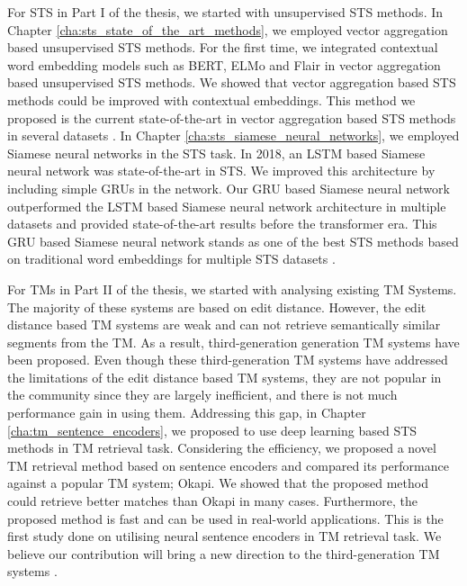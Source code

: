 For STS in Part I of the thesis, we started with unsupervised STS methods. In Chapter \ref{cha:sts_state_of_the_art_methods}, we employed vector aggregation based unsupervised STS methods. For the first time, we integrated contextual word embedding models such as BERT, ELMo and Flair in vector aggregation based unsupervised STS methods. We showed that vector aggregation based STS methods could be improved with contextual embeddings. This method we proposed is the current state-of-the-art in vector aggregation based STS methods in several datasets \autocite{ranasinghe-etal-2019-enhancing}. In Chapter \ref{cha:sts_siamese_neural_networks}, we employed Siamese neural networks in the STS task. In 2018, an LSTM based Siamese neural network was state-of-the-art in STS. We improved this architecture by including simple GRUs in the network. Our GRU based Siamese neural network outperformed the LSTM based Siamese neural network architecture in multiple datasets and provided state-of-the-art results before the transformer era. This GRU based Siamese neural network stands as one of the best STS methods based on traditional word embeddings for multiple STS datasets \autocite{ranasinghe-etal-2019-semantic}.

For TMs in Part II of the thesis, we started with analysing existing TM Systems. The majority of these systems are based on edit distance. However, the edit distance based TM systems are weak and can not retrieve semantically similar segments from the TM. As a result, third-generation generation TM systems have been proposed. Even though these third-generation TM systems have addressed the limitations of the edit distance based TM systems, they are not popular in the community since they are largely inefficient, and there is not much performance gain in using them. Addressing this gap, in Chapter \ref{cha:tm_sentence_encoders}, we proposed to use deep learning based STS methods in TM retrieval task. Considering the efficiency, we proposed a novel TM retrieval method based on sentence encoders and compared its performance against a popular TM system; Okapi. We showed that the proposed method could retrieve better matches than Okapi in many cases. Furthermore, the proposed method is fast and can be used in real-world applications. This is the first study done on utilising neural sentence encoders in TM retrieval task. We believe our contribution will bring a new direction to the third-generation TM systems \autocite{ranasinghe-etal-2020-intelligent, ranasinghe:2021}.

